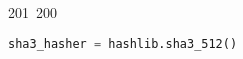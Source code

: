 201~200~\documentclass{article}
\begin{document}
\begin{lstlisting}[language=Python, caption=Server Password Hashing with SHA3-512]
	                                                                                                                                                                                                                                                                                                	                                                                                                                                        	    	                                                                                                	                                                                                                                                                                                                                                                                                                                                	                                                                        	                                                                        	                                                                                                                                        	                                                                                                                sha3_hasher = hashlib.sha3_512()
	                                                                                                                                                                                                                                                                                                	                                                                                                                                        	    	                                                                                                	                                                                                                                                                                                                                                                                                                                                	                                                                        	                                                                        	                                                                                                                                        	                                                                                                                    sha3_hasher.update(password)

\end{lstlisting}
\end{document}
